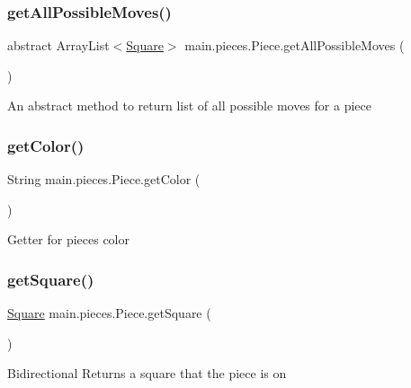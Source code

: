 \subsubsection{\texorpdfstring{get\+All\+Possible\+Moves()}{getAllPossibleMoves()}}
{\footnotesize\ttfamily abstract Array\+List$<$\hyperlink{classmain_1_1_square}{Square}$>$ main.\+pieces.\+Piece.\+get\+All\+Possible\+Moves (\begin{DoxyParamCaption}{ }\end{DoxyParamCaption})\hspace{0.3cm}{\ttfamily [abstract]}}

An abstract method to return list of all possible moves for a piece \mbox{\label{classmain_1_1pieces_1_1_piece_a52545d99f7a6c36b99cfcf40fd0a9cef}} 
\subsubsection{\texorpdfstring{get\+Color()}{getColor()}}
{\footnotesize\ttfamily String main.\+pieces.\+Piece.\+get\+Color (\begin{DoxyParamCaption}{ }\end{DoxyParamCaption})\hspace{0.3cm}{\ttfamily [inline]}}

Getter for piece\textquotesingle{}s color \mbox{\label{classmain_1_1pieces_1_1_piece_a562c0141b77a4d7bb0d8b0411cb48303}} 
\subsubsection{\texorpdfstring{get\+Square()}{getSquare()}}
{\footnotesize\ttfamily \hyperlink{classmain_1_1_square}{Square} main.\+pieces.\+Piece.\+get\+Square (\begin{DoxyParamCaption}{ }\end{DoxyParamCaption})\hspace{0.3cm}{\ttfamily [inline]}}

Bidirectional Returns a square that the piece is on \mbox{\label{classmain_1_1pieces_1_1_piece_a291b8f58d884f6dec30e101d0bbc59bd}} 
